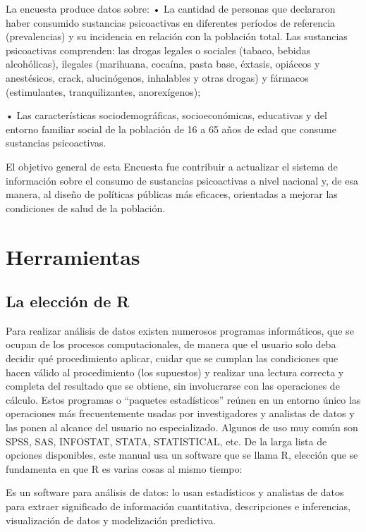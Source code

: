 \documentclass[]{book}
\begin{document}
La encuesta produce datos sobre:
• La cantidad de personas que declararon haber consumido sustancias psicoactivas en diferentes períodos de referencia (prevalencias) y su incidencia en relación con la población total. Las sustancias psicoactivas comprenden: las drogas legales o sociales (tabaco, bebidas alcohólicas), ilegales (marihuana, cocaína, pasta base, éxtasis, opiáceos y anestésicos, crack, alucinógenos, inhalables y otras drogas) y fármacos (estimulantes, tranquilizantes, anorexígenos);

• Las características sociodemográficas, socioeconómicas, educativas y del entorno familiar social de la población de 16 a 65 años de edad que consume sustancias psicoactivas.

El objetivo general de esta Encuesta fue contribuir a actualizar el sistema de información sobre el consumo de sustancias psicoactivas a nivel nacional y, de esa manera, al diseño de políticas públicas más eficaces, orientadas a mejorar las condiciones de salud de la población.

\hypertarget{herramientas}{%
\section{Herramientas}\label{herramientas}}

\hypertarget{la-elecciuxf3n-de-r}{%
\subsection{La elección de R}\label{la-elecciuxf3n-de-r}}

Para realizar análisis de datos existen numerosos programas informáticos, que se ocupan de los procesos computacionales, de manera que el usuario solo deba decidir qué procedimiento aplicar, cuidar que se cumplan las condiciones que hacen válido al procedimiento (los supuestos) y realizar una lectura correcta y completa del resultado que se obtiene, sin involucrarse con las operaciones de cálculo. Estos programas o ``paquetes estadísticos'' reúnen en un entorno único las operaciones más frecuentemente usadas por investigadores y analistas de datos y las ponen al alcance del usuario no especializado. Algunos de uso muy común son SPSS, SAS, INFOSTAT, STATA, STATISTICAL, etc. De la larga lista de opciones disponibles, este manual usa un software que se llama R, elección que se fundamenta en que R es varias cosas al mismo tiempo:

Es un software para análisis de datos: lo usan estadísticos y analistas de datos para extraer significado de información cuantitativa, descripciones e inferencias, visualización de datos y modelización predictiva.
\end{document}

